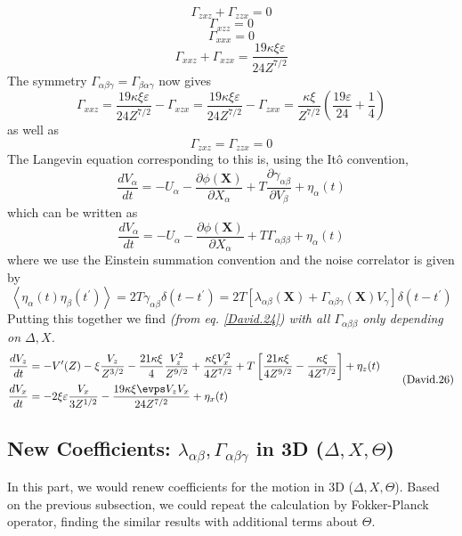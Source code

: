 \documentclass[books,12pt]{elegantpaper}
\newcommand{\ssc}{\subsection}
\newcommand{\pder}[2][]{\frac{\partial#1}{\partial#2}}
\newcommand{\beq}{\begin{equation}}
\newcommand{\eeq}{\end{equation}}
\newcommand{\bgn}{\begin{align}}
\newcommand{\tlag}[1]{\tag{#1} \label{#1}}
\newcommand{\veps}{\varepsilon}
\newcommand{\llang}{\left\langle}
\newcommand{\rrang}{\right\rangle}
\newcommand{\tit}{\textit}
\begin{document}
\beq \Gamma_{zxz} + \Gamma_{zzx} = 0 \tlag{David.17} \eeq
\beq \Gamma_{xzz} = 0 \tlag{David.18} \eeq
\beq \Gamma_{xxx} = 0 \tlag{David.19} \eeq
\beq \Gamma_{xxz} + \Gamma_{xzx} = \frac{19 \kappa \xi \veps}{24 Z^{7/2}} \tlag{David.20} \eeq
The symmetry $\Gamma_{\alpha\beta\gamma} = \Gamma_{\beta\alpha\gamma}$ now gives
\beq \Gamma_{xxz} = \frac{19 \kappa \xi \veps}{24 Z^{7/2}} - \Gamma_{xzx} = \frac{19 \kappa \xi \veps}{24 Z^{7/2}} - \Gamma_{zxx} = \frac{\kappa\xi}{Z^{7/2}} \left( \frac{19\veps}{24} + \frac{1}{4} \right) \tlag{David.21} \eeq
as well as
\beq \Gamma_{zxz} = \Gamma_{zzx} = 0 \tlag{David.22} \eeq
The Langevin equation corresponding to this is, using the Itô convention,
\beq \frac{dV_\alpha}{dt} = -U_\alpha - \pder[\phi(\mathbf{X})]{X_\alpha} + T \pder[\gamma_{\alpha\beta}]{V_\beta} + \eta_\alpha(t) \tlag{David.23} \eeq
which can be written as
\beq \frac{dV_\alpha}{dt} = -U_\alpha - \pder[\phi(\mathbf{X})]{X_\alpha} + T \Gamma_{\alpha\beta\beta} + \eta_\alpha(t) \tlag{David.24} \eeq
where we use the Einstein summation convention and the noise correlator is given by
\beq \llang \eta_\alpha (t) \eta_\beta(t^\prime) \rrang = 2T \gamma_{\alpha \beta} \delta(t-t^\prime) = 2T \left[ \lambda_{\alpha\beta}(\mathbf{X}) + \Gamma_{\alpha\beta\gamma}(\mathbf{X}) V_\gamma \right] \delta(t-t^\prime) \tlag{David.25} \eeq
Putting this together we find \tit{(from eq. \ref{David.24}) with all $\Gamma_{\alpha\beta\beta}$ only depending on $\Delta, X$.}
\beq \bgn
\frac{dV_z}{dt} &= -V^\prime(Z) - \xi \frac{V_z}{Z^{3/2}} - \frac{21\kappa\xi}{4}\frac{V_z^2}{Z^{9/2}} + \frac{\kappa \xi V_x^2}{4 Z^{7/2}} + T \left[ \frac{21 \kappa \xi}{4 Z^{9/2}} - \frac{\kappa \xi}{4 Z^{7/2}} \right] + \eta_z(t) \\
\frac{dV_x}{dt} &= -2\xi\veps \frac{V_x}{3 Z^{1/2}} - \frac{19 \kappa \xi \evps V_z V_x}{24 Z^{7/2}} + \eta_x(t) 
\end{align} \tlag{David.26} \eeq


\ssc{New Coefficients: $\lambda_{\alpha\beta}, \Gamma_{\alpha\beta\gamma}$ in 3D ($\Delta, X, \Theta$)}
In this part, we would renew coefficients for the motion in 3D ($\Delta, X, \Theta$). Based on the previous subsection, we could repeat the calculation by Fokker-Planck operator, finding the similar results with additional terms about $\Theta$.
\end{document}
